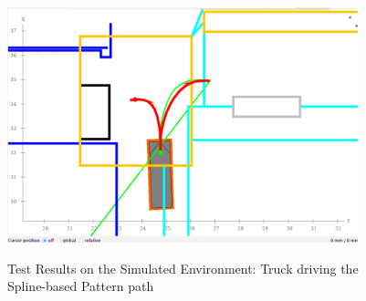 \begin{figure}[H]
    \begin{center}
        \includegraphics[width=4in]{images/Chap2/Pattern_spline_simulation_3_driving.png}\\
        \caption{Test Results on the Simulated Environment: Truck driving the Spline-based Pattern path}
        \label{driving}
        \end{center}    
\end{figure}

